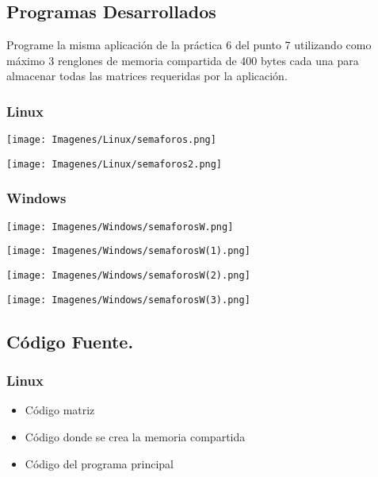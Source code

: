 \documentclass[12pt]{article}
\begin{document}
\subsection{Programas Desarrollados}
    Programe la misma aplicación de la práctica 6 del punto 7  utilizando como máximo 3 renglones de memoria compartida de 400 bytes cada una para almacenar todas las matrices requeridas por la aplicación.
    \subsubsection{Linux}
    \begin{center}
        \texttt{[image: Imagenes/Linux/semaforos.png]}
    \end{center}
    \begin{center}
        \texttt{[image: Imagenes/Linux/semaforos2.png]}
    \end{center}
    \subsubsection{Windows}
       \begin{center}
        \texttt{[image: Imagenes/Windows/semaforosW.png]}
    \end{center}
    \begin{center}
        \texttt{[image: Imagenes/Windows/semaforosW(1).png]}
    \end{center}
    \begin{center}
        \texttt{[image: Imagenes/Windows/semaforosW(2).png]}
    \end{center}
    \begin{center}
        \texttt{[image: Imagenes/Windows/semaforosW(3).png]}
    \end{center}
\subsection{Código Fuente.}
   \subsubsection{Linux}
   \begin{itemize}
       \item Código matriz
       
       \item Código donde se crea la memoria compartida
       
       \item Código del programa principal
       
   \end{itemize}
   
\end{document}

